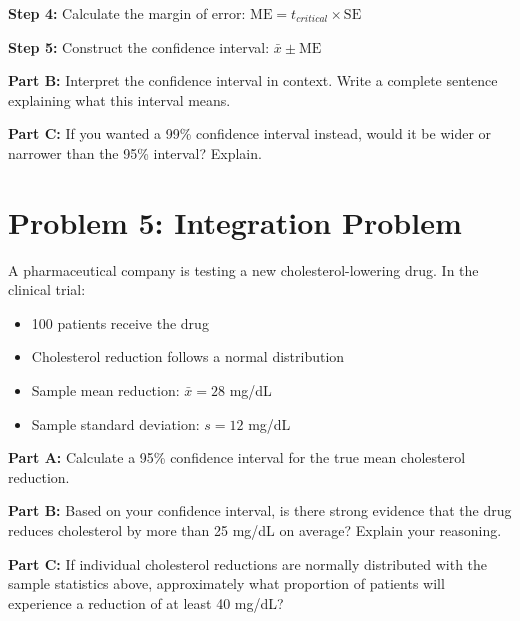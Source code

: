 \documentclass[11pt]{article}
\begin{document}
\vspace{2cm}

\textbf{Step 4:} Calculate the margin of error: $\text{ME} = t_{critical} \times \text{SE}$

\vspace{2cm}

\textbf{Step 5:} Construct the confidence interval: $\bar{x} \pm \text{ME}$

\vspace{2.5cm}

\textbf{Part B:} Interpret the confidence interval in context. Write a complete sentence explaining what this interval means.

\vspace{3cm}

\textbf{Part C:} If you wanted a 99\% confidence interval instead, would it be wider or narrower than the 95\% interval? Explain.

\vspace{2.5cm}

\newpage

\section{Problem 5: Integration Problem}

A pharmaceutical company is testing a new cholesterol-lowering drug. In the clinical trial:
\begin{itemize}
\item 100 patients receive the drug
\item Cholesterol reduction follows a normal distribution
\item Sample mean reduction: $\bar{x} = 28$ mg/dL
\item Sample standard deviation: $s = 12$ mg/dL
\end{itemize}

\vspace{6pt}

\textbf{Part A:} Calculate a 95\% confidence interval for the true mean cholesterol reduction.

\vspace{4cm}

\textbf{Part B:} Based on your confidence interval, is there strong evidence that the drug reduces cholesterol by more than 25 mg/dL on average? Explain your reasoning.

\vspace{3cm}

\textbf{Part C:} If individual cholesterol reductions are normally distributed with the sample statistics above, approximately what proportion of patients will experience a reduction of at least 40 mg/dL?
\end{document}
